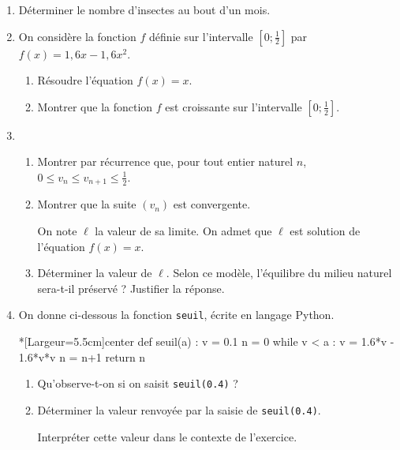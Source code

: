 \begin{enumerate}
	\item Déterminer le nombre d’insectes au bout d’un mois.
	\item On considère la fonction $f$ définie sur l’intervalle $\left[0;\frac12\right]$ par $f(x)=1,6x-1,6x^2$.
	\begin{enumerate}
		\item Résoudre l’équation $f(x)=x$.
		\item Montrer que la fonction $f$ est croissante sur l'intervalle $\left[0;\frac12\right]$.
	\end{enumerate}
	\item 
	\begin{enumerate}
		\item Montrer par récurrence que, pour tout entier naturel $n$, $0 \leqslant v_n \leqslant v_{n+1} \leqslant \frac12$.
		\item Montrer que la suite $\left(v_n\right)$ est convergente.
		
		\smallskip
		
		On note $\ell$ la valeur de sa limite. On admet que $\ell$ est solution de l’équation $f(x)=x$.
		\item Déterminer la valeur de $\ell$. Selon ce modèle, l’équilibre du milieu naturel sera-t-il préservé ? Justifier la réponse.
	\end{enumerate}
	\item On donne ci-dessous la fonction \texttt{seuil}, écrite en langage \textsf{Python}.

\begin{CodePythonLstAlt}*[Largeur=5.5cm]{center}
def seuil(a) :
	v = 0.1
	n = 0
	while v < a :
		v = 1.6*v - 1.6*v*v
		n = n+1
	return n
\end{CodePythonLstAlt}
	\begin{enumerate}
		\item Qu’observe-t-on si on saisit \texttt{seuil(0.4)} ?
		\item Déterminer la valeur renvoyée par la saisie de \texttt{seuil(0.4)}.
		
		Interpréter cette valeur dans le contexte de l’exercice. 
	\end{enumerate}
\end{enumerate}
